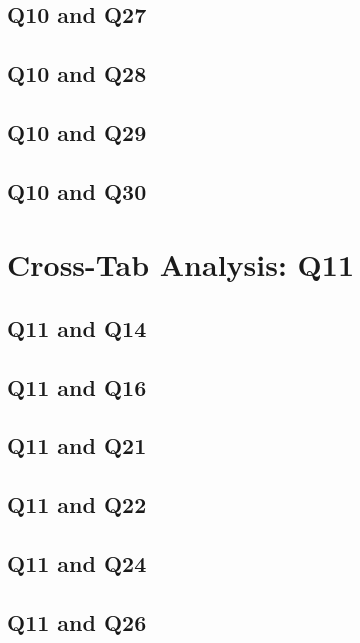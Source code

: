 \documentclass{report}
\begin{document}
\clearpage
\section{Q10 and Q27}


\clearpage
\section{Q10 and Q28}


\clearpage
\section{Q10 and Q29}


\clearpage
\section{Q10 and Q30}


\chapter{Cross-Tab Analysis: Q11}
\section{Q11 and Q14}


\clearpage
\section{Q11 and Q16}


\clearpage
\section{Q11 and Q21}


\clearpage
\section{Q11 and Q22}


\clearpage
\section{Q11 and Q24}


\clearpage
\section{Q11 and Q26}

\end{document}
